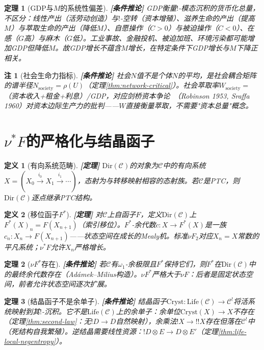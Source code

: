 \documentclass[11pt,a4paper]{article}
\newtheorem{definition}{定义}
\newtheorem{theorem}{定理}
\newtheorem{remark}{注}
\newcommand{\lvl}[1]{\hfill\textbf{\footnotesize[#1]}}
\newcommand{\lvP}{\lvl{定理}}
\newcommand{\lvC}{\lvl{条件推论}}
\newcommand{\bang}{{!}}
\begin{document}
\begin{theorem}[GDP与$M$的系统性偏差]\label{thm:gdp-m-bias}\lvC
GDP衡量$\bang$-模态沉积的货币化总量，不区分：线性产出（活劳动创造）与$\bang$-空转（资本增殖）、滋养生命的产出（提高$M$）与萃取生命的产出（降低$M$）、自愿操作（$C>0$）与被迫操作（$C<0$）、在感（$G$高）与麻木（$G$低）。工业事故、金融投机、被迫加班、环境污染都可能增加GDP但降低$M$。故GDP增长不蕴含$M$增长，在特定条件下GDP增长与$M$下降正相关。
\end{theorem}

\begin{remark}[社会生命力指标]\lvC
社会$N$值不是个体$N$的平均，是社会耦合矩阵的谱半径$N_{\mathrm{society}}=\rho(U)$（定理\ref{thm:network-critical}）。社会萃取率$W_{\mathrm{society}}=$（资本收入+租金+利息）/GDP，对应剑桥资本争论~\cite{keene78}（Robinson 1953, Sraffa 1960）对资本边际生产力的批判——$W$直接衡量萃取，不需要"资本总量"概念。
\end{remark}


\section{$\nu^*F$的严格化与结晶函子}

\begin{definition}[有向系统范畴]\label{def:dir-cat}\lvP
$\mathrm{Dir}(\mathcal{C})$的对象为$\mathcal{C}$中的有向系统$X=(X_0\xrightarrow{i_0}X_1\xrightarrow{i_1}\cdots)$，态射为与转移映射相容的态射族。若$\mathcal{C}$是PTC，则$\mathrm{Dir}(\mathcal{C})$逐点继承PTC结构。
\end{definition}

\begin{definition}[移位函子$F^*$]\label{def:shift-functor}\lvP
对$\mathcal{C}$上自函子$F$，定义$\mathrm{Dir}(\mathcal{C})$上$F^*(X)_n=F(X_{n+1})$（索引移位）。$F^*$-余代数$c:X\to F^*(X)$是一族$c_n:X_n\to F(X_{n+1})$——状态空间在成长的Mealy机。标准$\nu F_2$对应$X_n=X$常数的平凡系统；$\nu^*F$允许$X_n$严格增长。
\end{definition}

\begin{theorem}[$\nu F^*$存在]\label{thm:nustar-exists}\lvC
若$\mathcal{C}$有$\omega_1$-余极限且$F^*$保持它们，则$F^*$在$\mathrm{Dir}(\mathcal{C})$中的最终余代数存在（Ad\'amek--Milius构造）。$\nu F^*$严格大于$\nu F$：后者是固定状态空间，前者允许状态空间逐次扩展。
\end{theorem}

\begin{theorem}[结晶函子不是余单子]\label{thm:cryst-not-comonad}\lvC
结晶函子$\mathrm{Cryst}:\mathrm{Life}(\mathcal{C})\to\mathcal{C}^!$将活系统映射到其$\bang$-沉积。它不是$\mathrm{Life}(\mathcal{C})$上的余单子：余单位$\mathrm{Cryst}(X)\to X$不存在（定理\ref{thm:second-law}：无$\bang D\to D$自然映射），余乘法$\bang X\to\bang\bang X$存在但落在$\mathcal{C}^!$中（死结构自我繁殖）。逆结晶需要线性资源：$\bang D\otimes E\to D\otimes E'$（定理\ref{thm:life-local-negentropy}）。
\end{theorem}
\end{document}
